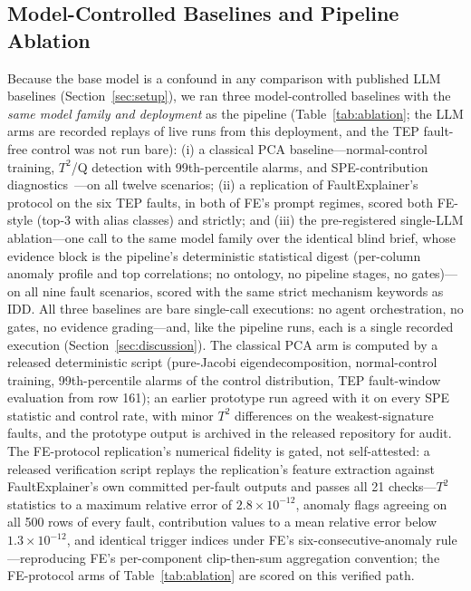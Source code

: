 \documentclass[preprint,10pt]{elsarticle}
\begin{document}
\subsection{Model-Controlled Baselines and Pipeline Ablation}\label{sec:ablation}
Because the base model is a confound in any comparison with published LLM baselines (Section~\ref{sec:setup}), we ran three model-controlled baselines with the \emph{same model family and deployment} as the pipeline (Table~\ref{tab:ablation}; the LLM arms are recorded replays of live runs from this deployment, and the TEP fault-free control was not run bare): (i) a classical PCA baseline---normal-control training, $T^2$/Q detection with 99th-percentile alarms, and SPE-contribution diagnostics~\cite{chiang2001fault,qin2012survey}---on all twelve scenarios; (ii) a replication of FaultExplainer's protocol on the six TEP faults, in both of FE's prompt regimes, scored both FE-style (top-3 with alias classes) and strictly; and (iii) the pre-registered single-LLM ablation---one call to the same model family over the identical blind brief, whose evidence block is the pipeline's deterministic statistical digest (per-column anomaly profile and top correlations; no ontology, no pipeline stages, no gates)---on all nine fault scenarios, scored with the same strict mechanism keywords as IDD. All three baselines are bare single-call executions: no agent orchestration, no gates, no evidence grading---and, like the pipeline runs, each is a single recorded execution (Section~\ref{sec:discussion}). The classical PCA arm is computed by a released deterministic script (pure-Jacobi eigendecomposition, normal-control training, 99th-percentile alarms of the control distribution, TEP fault-window evaluation from row 161); an earlier prototype run agreed with it on every SPE statistic and control rate, with minor $T^2$ differences on the weakest-signature faults, and the prototype output is archived in the released repository for audit. The FE-protocol replication's numerical fidelity is gated, not self-attested: a released verification script replays the replication's feature extraction against FaultExplainer's own committed per-fault outputs and passes all 21 checks---$T^2$ statistics to a maximum relative error of $2.8{\times}10^{-12}$, anomaly flags agreeing on all 500 rows of every fault, contribution values to a mean relative error below $1.3{\times}10^{-12}$, and identical trigger indices under FE's six-consecutive-anomaly rule---reproducing FE's per-component clip-then-sum aggregation convention; the FE-protocol arms of Table~\ref{tab:ablation} are scored on this verified path.
\end{document}
